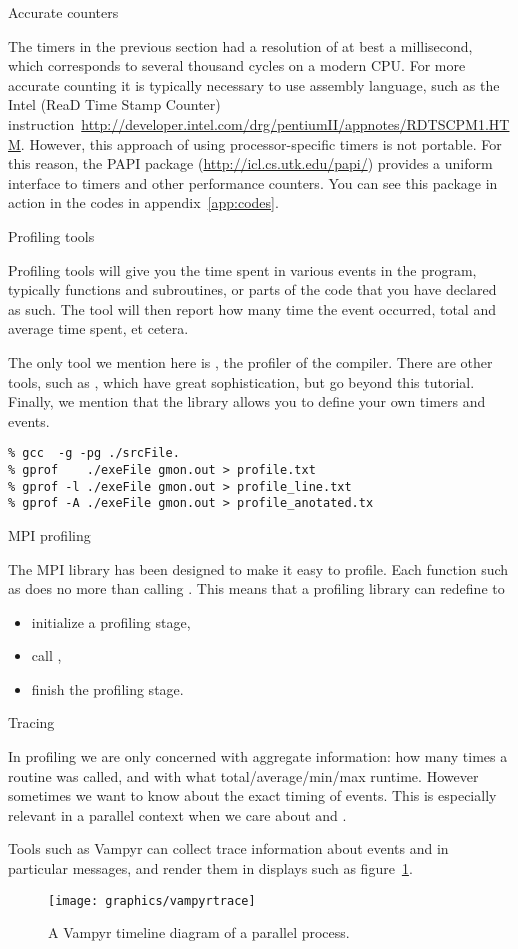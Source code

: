  {Accurate counters}

The timers in the previous section had a resolution of at best a
millisecond, which corresponds to several thousand cycles on a modern
CPU. For more accurate counting it is typically necessary to use
assembly language, such as the Intel  (ReaD Time Stamp
Counter)
instruction~\url{http://developer.intel.com/drg/pentiumII/appnotes/RDTSCPM1.HTM}. However,
this approach of using processor-specific timers is not portable. For
this reason, the PAPI package (\url{http://icl.cs.utk.edu/papi/})
provides a uniform interface to timers and other performance
counters. You can see this package in action in the codes in
appendix~\ref{app:codes}.

 {Profiling tools}

Profiling tools will give you the time spent in various events in the
program, typically functions and subroutines, or parts of the code
that you have declared as such. The tool will then report how many
time the event occurred, total and average time spent, et cetera.

The only tool we mention here is , the profiler of
the  compiler. There are other tools, such as
, which have great sophistication, but go beyond this
tutorial. Finally, we mention that the  library
allows you to define your own timers and events.

\begin{verbatim}
% gcc  -g -pg ./srcFile.
% gprof    ./exeFile gmon.out > profile.txt
% gprof -l ./exeFile gmon.out > profile_line.txt
% gprof -A ./exeFile gmon.out > profile_anotated.tx
\end{verbatim}

 {MPI profiling}

The MPI library has been designed to make it easy to profile. Each
function such as  does no more than calling
. This means that a profiling library can redefine
 to
\begin{itemize}
\item initialize a profiling stage,\item call , \item
  finish the profiling stage.
\end{itemize}

 {Tracing}

In profiling we are only concerned with aggregate information: how
many times a routine was called, and with what total/average/min/max
runtime. However sometimes we want to know about the exact timing of
events. This is especially relevant in a parallel context when we care
about  and .

Tools such as Vampyr can collect trace information about
events and in particular messages, and render them in displays such as
figure~\ref{fig:vampyr}.
\begin{figure}[ht]
  \texttt{[image: graphics/vampyrtrace]}
  \caption{A Vampyr timeline diagram of a parallel process.}
  \label{fig:vampyr}
\end{figure}
